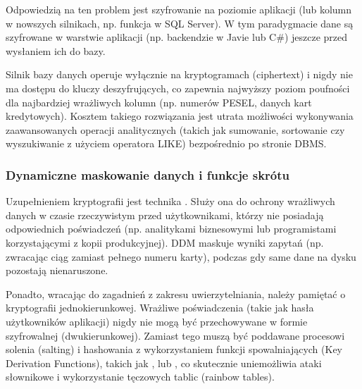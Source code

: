 \documentclass[a4paper,11pt,english,openany,oneside]{sphinxmanual}
\begin{document}
\sphinxAtStartPar
Odpowiedzią na ten problem jest szyfrowanie na poziomie aplikacji (lub kolumn w nowszych silnikach, np. funkcja  w SQL Server). W tym paradygmacie dane są szyfrowane w warstwie aplikacji (np. backendzie w Javie lub C\#) jeszcze przed wysłaniem ich do bazy.

\sphinxAtStartPar
Silnik bazy danych operuje wyłącznie na kryptogramach (ciphertext) i nigdy nie ma dostępu do kluczy deszyfrujących, co zapewnia najwyższy poziom poufności dla najbardziej wrażliwych kolumn (np. numerów PESEL, danych kart kredytowych). Kosztem takiego rozwiązania jest utrata możliwości wykonywania zaawansowanych operacji analitycznych (takich jak sumowanie, sortowanie czy wyszukiwanie z użyciem operatora LIKE) bezpośrednio po stronie DBMS.


\subsubsection{Dynamiczne maskowanie danych i funkcje skrótu}
\label{\detokenize{rozdzial_2/rozdzial_27/rozdzial_4:dynamiczne-maskowanie-danych-i-funkcje-skrotu}}
\sphinxAtStartPar
Uzupełnieniem kryptografii jest technika . Służy ona do ochrony wrażliwych danych w czasie rzeczywistym przed użytkownikami, którzy nie posiadają odpowiednich poświadczeń (np. analitykami biznesowymi lub programistami korzystającymi z kopii produkcyjnej). DDM maskuje wyniki zapytań (np. zwracając ciąg  zamiast pełnego numeru karty), podczas gdy same dane na dysku pozostają nienaruszone.

\sphinxAtStartPar
Ponadto, wracając do zagadnień z zakresu uwierzytelniania, należy pamiętać o kryptografii jednokierunkowej. Wrażliwe poświadczenia (takie jak hasła użytkowników aplikacji) nigdy nie mogą być przechowywane w formie szyfrowalnej (dwukierunkowej). Zamiast tego muszą być poddawane procesowi solenia (salting) i hashowania z wykorzystaniem funkcji spowalniających (Key Derivation Functions), takich jak ,  lub , co skutecznie uniemożliwia ataki słownikowe i wykorzystanie tęczowych tablic (rainbow tables).

\sphinxstepscope
\end{document}
